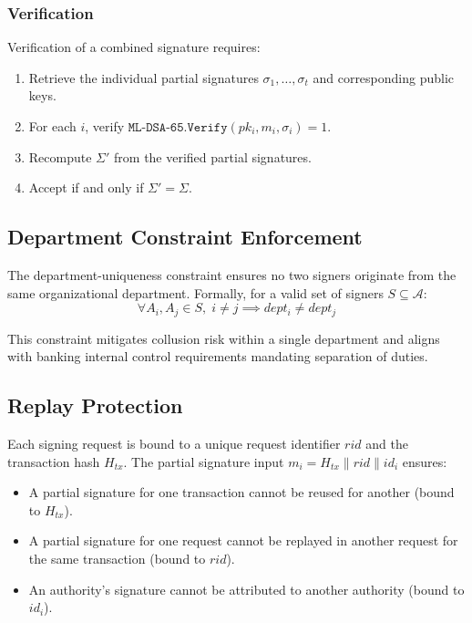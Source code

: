 \documentclass[conference,10pt]{IEEEtran}
\begin{document}
\subsubsection{Verification}
Verification of a combined signature requires:
\begin{enumerate}
\item Retrieve the individual partial signatures $\sigma_1, \ldots, \sigma_t$ and corresponding public keys.
\item For each $i$, verify $\texttt{ML-DSA-65.Verify}(pk_i, m_i, \sigma_i) = 1$.
\item Recompute $\Sigma'$ from the verified partial signatures.
\item Accept if and only if $\Sigma' = \Sigma$.
\end{enumerate}

\subsection{Department Constraint Enforcement}

The department-uniqueness constraint ensures no two signers originate from the same organizational department. Formally, for a valid set of signers $S \subseteq \mathcal{A}$:
\begin{equation}
\forall A_i, A_j \in S, \; i \neq j \implies dept_i \neq dept_j
\end{equation}

This constraint mitigates collusion risk within a single department and aligns with banking internal control requirements mandating separation of duties.

\subsection{Replay Protection}

Each signing request is bound to a unique request identifier $rid$ and the transaction hash $H_{tx}$. The partial signature input $m_i = H_{tx} \| rid \| id_i$ ensures:
\begin{itemize}
\item A partial signature for one transaction cannot be reused for another (bound to $H_{tx}$).
\item A partial signature for one request cannot be replayed in another request for the same transaction (bound to $rid$).
\item An authority's signature cannot be attributed to another authority (bound to $id_i$).
\end{itemize}
\end{document}
